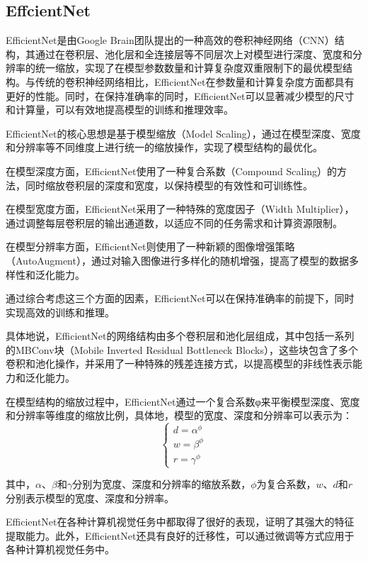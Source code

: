 \subsection{EffcientNet}
EfficientNet\cite{tanEfficientNetRethinkingModel}是由Google Brain团队提出的一种高效的卷积神经网络（CNN）结构，其通过在卷积层、池化层和全连接层等不同层次上对模型进行深度、宽度和分辨率的统一缩放，实现了在模型参数数量和计算复杂度双重限制下的最优模型结构。与传统的卷积神经网络相比，EfficientNet在参数量和计算复杂度方面都具有更好的性能。同时，在保持准确率的同时，EfficientNet可以显著减少模型的尺寸和计算量，可以有效地提高模型的训练和推理效率。

EfficientNet的核心思想是基于模型缩放（Model Scaling），通过在模型深度、宽度和分辨率等不同维度上进行统一的缩放操作，实现了模型结构的最优化。

在模型深度方面，EfficientNet使用了一种复合系数（Compound Scaling）的方法，同时缩放卷积层的深度和宽度，以保持模型的有效性和可训练性。

在模型宽度方面，EfficientNet采用了一种特殊的宽度因子（Width Multiplier），通过调整每层卷积层的输出通道数，以适应不同的任务需求和计算资源限制。

在模型分辨率方面，EfficientNet则使用了一种新颖的图像增强策略（AutoAugment），通过对输入图像进行多样化的随机增强，提高了模型的数据多样性和泛化能力。

通过综合考虑这三个方面的因素，EfficientNet可以在保持准确率的前提下，同时实现高效的训练和推理。

具体地说，EfficientNet的网络结构由多个卷积层和池化层组成，其中包括一系列的MBConv块（Mobile Inverted Residual Bottleneck Blocks），这些块包含了多个卷积和池化操作，并采用了一种特殊的残差连接方式，以提高模型的非线性表示能力和泛化能力。

在模型结构的缩放过程中，EfficientNet通过一个复合系数φ来平衡模型深度、宽度和分辨率等维度的缩放比例，具体地，模型的宽度、深度和分辨率可以表示为：
$$
\left\{\begin{matrix}
 d=\alpha^{\phi}\\
 w=\beta^{\phi}\\
r=\gamma^{\phi}
\end{matrix}\right.
$$

其中，$\alpha$、$\beta$和$\gamma$分别为宽度、深度和分辨率的缩放系数，$\phi$为复合系数，$w$、$d$和$r$分别表示模型的宽度、深度和分辨率。

EfficientNet在各种计算机视觉任务中都取得了很好的表现，证明了其强大的特征提取能力。此外，EfficientNet还具有良好的迁移性，可以通过微调等方式应用于各种计算机视觉任务中。

